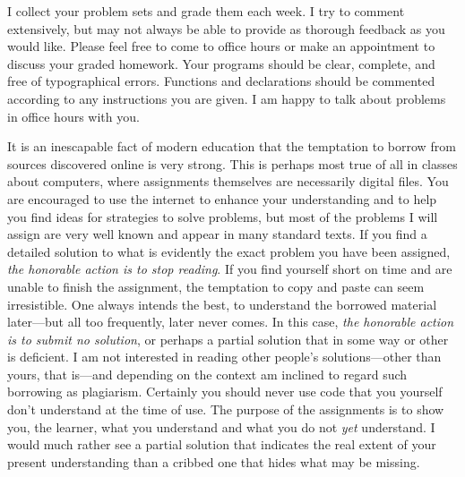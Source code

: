 \documentclass[symmetric]{tufte-handout}
\begin{document}

    I collect your problem sets and grade them each week. I try to comment
    extensively, but may not always be able to provide as thorough feedback as
    you would like. Please feel free to come to office hours or make an
    appointment to discuss your graded homework.%
    Your programs should be clear, complete, and free of typographical
    errors. Functions and declarations should be commented according to any
    instructions you are given. %
    I am happy to talk about problems in office hours with you.

    It is an inescapable fact of modern education that the temptation to
    borrow from sources discovered online is very strong. This is perhaps most
    true of all in classes about computers, where assignments themselves are
    necessarily digital files. You are encouraged to use the internet to
    enhance your understanding and to help you find ideas for strategies to
    solve problems, but most of the problems I will assign are very well known
    and appear in many standard texts. If you find a detailed solution to what
    is evidently the exact problem you have been assigned, \emph{the honorable
    action is to stop reading}. If you find yourself short on time and are
    unable to finish the assignment, the temptation to copy and paste can seem
    irresistible. One always intends the best, to understand the borrowed
    material later---but all too frequently, later never comes. In this case,
    \emph{the honorable action is to submit no solution}, or perhaps a partial
    solution that in some way or other is deficient. I am not interested in
    reading other people's solutions---other than yours, that is---and
    depending on the context am inclined to regard such borrowing as
    plagiarism. Certainly you should never use code that you yourself don't
    understand at the time of use. The purpose of the assignments is to show
    you, the learner, what you understand and what you do not \emph{yet}
    understand. I would much rather see a partial solution that indicates the
    real extent of your present understanding than a cribbed one that hides
    what may be missing.
\end{document}
